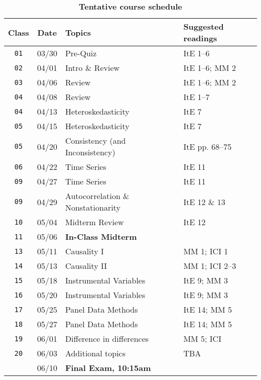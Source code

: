 \documentclass[10pt]{article}
\newcommand{\ra}[1]{\renewcommand{\arraystretch}{#1}}
\begin{document}
\begin{table}[htb]
  \caption*{\textbf{Tentative course schedule}}
  \ra{1.5}
  \begin{tabular}{@{\extracolsep{1cm}} c c l l @{}}
    \toprule
    \textbf{Class} & \textbf{Date} & \textbf{Topics} & \textbf{Suggested readings}  \\ \toprule
    \texttt{01} & 03/30 & Pre-Quiz & ItE 1--6 \\
    \texttt{02} & 04/01 & Intro \& Review & ItE 1--6; MM 2 \\
    \texttt{03} & 04/06 & Review & ItE 1--6; MM 2 \\
    \texttt{04} & 04/08 & Review & ItE 1--7 \\
    \texttt{04} & 04/13 & Heteroskedasticity & ItE 7 \\
    \texttt{05} & 04/15 & Heteroskedasticity & ItE 7 \\
    \texttt{05} & 04/20 & Consistency (and Inconsistency) & ItE pp. 68--75  \\
    \texttt{06} & 04/22 & Time Series & ItE 11\\
    \texttt{09} & 04/27 & Time Series & ItE 11 \\
    \texttt{09} & 04/29 & Autocorrelation \& Nonstationarity & ItE 12 \& 13 \\
    \texttt{10} & 05/04 & Midterm Review & ItE 12 \\ \midrule
    \texttt{11} & 05/06 & \textbf{In-Class Midterm} \\ \midrule
    \texttt{13} & 05/11 & Causality I & MM 1; ICI 1\\
    \texttt{14} & 05/13 & Causality II & MM 1; ICI 2--3\\
    \texttt{15} & 05/18 & Instrumental Variables & ItE 9; MM 3 \\
    \texttt{16} & 05/20 & Instrumental Variables & ItE 9; MM 3 \\
    \texttt{17} & 05/25 & Panel Data Methods & ItE 14; MM 5 \\
    \texttt{18} & 05/27 & Panel Data Methods & ItE 14; MM 5 \\
    \texttt{19} & 06/01 & Difference in differences & MM 5; ICI  \\
    \texttt{20} & 06/03 & Additional topics & TBA \\ \midrule
    \texttt{  } & 06/10 & \textbf{Final Exam, 10:15am} & \\
    \bottomrule
  \end{tabular}
\end{table}
\end{document}
